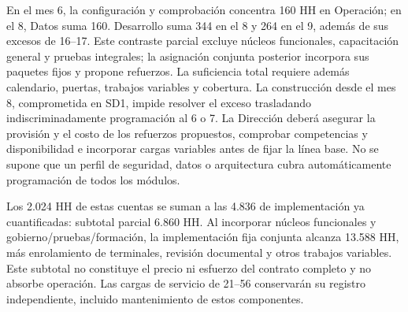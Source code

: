 En el mes 6, la configuración y comprobación concentra 160 HH en Operación; en el 8, Datos suma 160. Desarrollo suma 344 en el 8 y 264 en el 9, además de sus excesos de 16--17. Este contraste parcial excluye núcleos funcionales, capacitación general y pruebas integrales; la asignación conjunta posterior incorpora sus paquetes fijos y propone refuerzos. La suficiencia total requiere además calendario, puertas, trabajos variables y cobertura. La construcción desde el mes 8, comprometida en SD1, impide resolver el exceso trasladando indiscriminadamente programación al 6 o 7. La Dirección deberá asegurar la provisión y el costo de los refuerzos propuestos, comprobar competencias y disponibilidad e incorporar cargas variables antes de fijar la línea base. No se supone que un perfil de seguridad, datos o arquitectura cubra automáticamente programación de todos los módulos.

Los 2.024 HH de estas cuentas se suman a las 4.836 de implementación ya cuantificadas: subtotal parcial 6.860 HH. Al incorporar núcleos funcionales y gobierno/pruebas/formación, la implementación fija conjunta alcanza 13.588 HH, más enrolamiento de terminales, revisión documental y otros trabajos variables. Este subtotal no constituye el precio ni esfuerzo del contrato completo y no absorbe operación. Las cargas de servicio de 21--56 conservarán su registro independiente, incluido mantenimiento de estos componentes.
